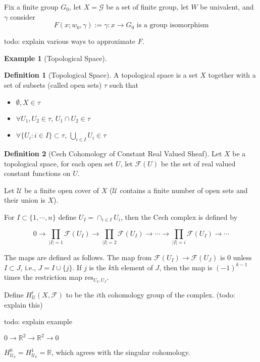 \documentclass[11pt, oneside]{article}   	%
\theoremstyle{definition}
\newtheorem*{defn}{Definition}
\newtheorem*{eg}{Example}
\begin{document}
Fix a finite group $G_0$, let $X=\mathcal{G}$ be a set of finite group, let $W$ be univalent, and $\gamma$ consider
\begin{equation}
	F(x; w_0, \gamma) := \gamma: x \to G_0\text{ is a group isomorphism}
\end{equation}

todo: explain various ways to approximate $F$.

\begin{eg}
	[Topological Space]

	\begin{defn}[Topological Space]
		A topological space is a set $X$ together with a set of subsets (called open sets) $\tau$ such that
		\begin{itemize}
			\item $\emptyset, X\in \tau$
			\item $\forall U_1, U_2\in \tau$, $U_1\cap U_2\in \tau$
			\item $\forall \{U_i:i\in I\}\subset \tau$, $\bigcup_{i\in I}U_i\in \tau$
		\end{itemize}
	\end{defn}

	\begin{defn}[Cech Cohomology of Constant Real Valued Sheaf]
		Let $X$ be a topological space, for each open set $U$, let $\mathscr{F}(U)$ be the set of real valued constant functions on $U$.

		Let $\mathcal{U}$ be a finite open cover of $X$ ($\mathcal{U}$ contains a finite number of open sets and their union is $X$).

		For $I\subset \{1,\cdots,n\}$ define $U_I=\cap_{i\in I} U_i$, then the Cech complex is defined by

		\begin{equation}
			0\to \prod_{|I|=1} \mathscr{F}(U_I)\to
			\prod_{|I|=2} \mathscr{F}(U_I)\to
			\cdots \to 
			\prod_{|I|=i} \mathscr{F}(U_I)\to\cdots
		\end{equation}
	\end{defn}

	The maps are defined as follows. The map from $\mathscr{F}(U_I)\to \mathscr{F}(U_J)$ is 0 unless $I\subset J$, i.e., $J=I\cup \{j\}$. If $j$ is the $k$th element of $J$, then the map is $(-1)^{k-1}$ times the restriction map $\text{res}_{U_I,U_J}$.

	Define $H^i_{\mathcal{U}}(X, \mathscr{F})$ to be the $i$th cohomology group of the complex. (todo: explain this)

	todo: explain example

	$0\to \mathbb{R}^2\to \mathbb{R}^2\to 0$

	$H^0_{\mathcal{U}_k}=H^1_{\mathcal{U}_k}=\mathbb{R}$, which agrees with the singular cohomology.
\end{eg}
\end{document}
